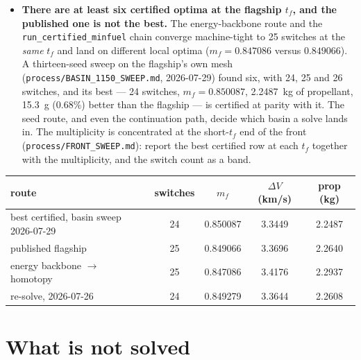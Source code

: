 \documentclass[11pt]{article}
\newcommand{\file}[1]{\texttt{#1}}
\begin{document}
\begin{itemize}
\item \textbf{There are at least six certified optima at the flagship $t_f$,
and the published one is not the best.} The energy-backbone route and the
\file{run\_certified\_minfuel} chain converge machine-tight to 25 switches at
the \emph{same} $t_f$ and land on different local optima ($m_f = 0.847086$
versus $0.849066$). A thirteen-seed sweep on the flagship's own mesh
(\file{process/BASIN\_1150\_SWEEP.md}, 2026-07-29) found six, with 24, 25 and
26 switches, and its best --- 24 switches, $m_f = 0.850087$, \SI{2.2487}{kg}
of propellant, \SI{15.3}{g} (0.68\%) better than the flagship --- is certified
at parity with it. The seed route, and even the continuation path, decide
which basin a solve lands in. The multiplicity is concentrated at the
short-$t_f$ end of the front (\file{process/FRONT\_SWEEP.md}): report the best
certified row at each $t_f$ together with the multiplicity, and the switch
count as a band.
\end{itemize}

\begin{center}
\begin{tabular}{lS[table-format=2.0]S[table-format=1.6]S[table-format=1.4]S[table-format=1.4]}
\toprule
route & {switches} & {$m_f$} & {$\Delta V$ (km/s)} & {prop (kg)} \\
\midrule
best certified, basin sweep 2026-07-29 & 24 & 0.850087 & 3.3449 & 2.2487 \\
published flagship             & 25 & 0.849066 & 3.3696 & 2.2640 \\
energy backbone $\to$ homotopy & 25 & 0.847086 & 3.4176 & 2.2937 \\
re-solve, 2026-07-26           & 24 & 0.849279 & 3.3644 & 2.2608 \\
\bottomrule
\end{tabular}
\end{center}

\section{What is not solved}
\label{sec:open}
\end{document}
